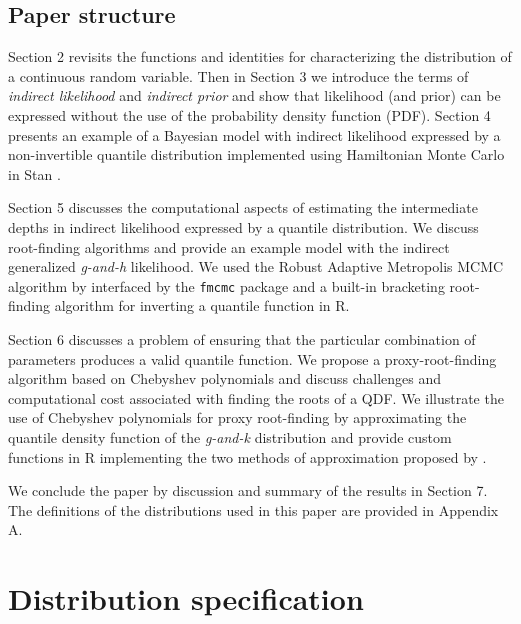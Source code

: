 \documentclass[
  12pt,
]{article}
\begin{document}
\hypertarget{paper-structure}{%
\subsection{Paper structure}\label{paper-structure}}

Section 2 revisits the functions and identities for characterizing the distribution of a continuous random variable. Then in Section 3 we introduce the terms of \emph{indirect likelihood} and \emph{indirect prior} and show that likelihood (and prior) can be expressed without the use of the probability density function (PDF). Section 4 presents an example of a Bayesian model with indirect likelihood expressed by a non-invertible quantile distribution implemented using Hamiltonian Monte Carlo in Stan \citep{standevelopmentteam2021RStanInterfaceStan}.

Section 5 discusses the computational aspects of estimating the intermediate depths in indirect likelihood expressed by a quantile distribution. We discuss root-finding algorithms and provide an example model with the indirect generalized \emph{g-and-h} \citep{haynes1997RobustnessRankingSelection} likelihood. We used the Robust Adaptive Metropolis MCMC algorithm by \citet{vihola2012RobustAdaptiveMetropolis} interfaced by the \texttt{fmcmc} package \citep{vegayon2019FmcmcFriendlyMCMC} and a built-in bracketing root-finding algorithm for inverting a quantile function in R\citep{rcoreteam2021LanguageEnvironmentStatistical}.

Section 6 discusses a problem of ensuring that the particular combination of parameters produces a valid quantile function. We propose a proxy-root-finding algorithm based on Chebyshev polynomials and discuss challenges and computational cost associated with finding the roots of a QDF. We illustrate the use of Chebyshev polynomials for proxy root-finding by approximating the quantile density function of the \emph{g-and-k} distribution and provide custom functions in R implementing the two methods of approximation proposed by \citet{boyd2013FindingZerosUnivariate}.

We conclude the paper by discussion and summary of the results in Section 7. The definitions of the distributions used in this paper are provided in Appendix A.

\hypertarget{distribution-specification}{%
\section{Distribution specification}\label{distribution-specification}}
\end{document}
